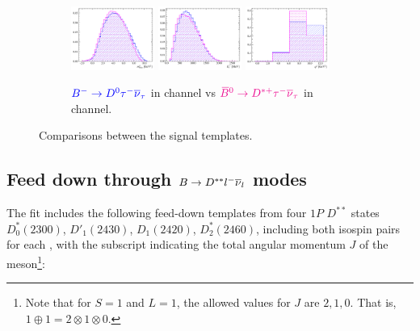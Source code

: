 \begin{figure}[!htb]
    \begin{subfigure}{\textwidth}
        \centering
        \includegraphics[width=0.3\textwidth]{figs-fit-fit-templates/histo-comp/D0_iso_D0Tau__vs__Dst_iso_DstTau__m2miss.pdf}
        \includegraphics[width=0.3\textwidth]{figs-fit-fit-templates/histo-comp/D0_iso_D0Tau__vs__Dst_iso_DstTau__el.pdf}
        \includegraphics[width=0.3\textwidth]{figs-fit-fit-templates/histo-comp/D0_iso_D0Tau__vs__Dst_iso_DstTau__q2.pdf}

        \caption{
            $\textcolor{blue}{{{{B}^-}} \rightarrow {\ensuremath{{D}^0}}{\ensuremath{\tau^-}}{\ensuremath{{\overline{\nu}}_\tau}}}$
            in \Dz channel
            vs
            $\textcolor{magenta}{{{\kern 0.18em\overline{\kern -0.18em B}}{}^0} \rightarrow {\ensuremath{{D}^{*+}}}{\ensuremath{\tau^-}}{\ensuremath{{\overline{\nu}}_\tau}}}$
            in \Dstar channel.
        }
    \end{subfigure}
    \caption{Comparisons between the signal templates.}
    \label{fig:d0-sig-vs-dst-sig}
\end{figure}


\subsection{Feed down through $B \rightarrow D^{**}{l^-}{{\overline{\nu}}_l}$ modes}
\label{tmpl:dstst}

The fit includes the following feed-down templates from four $1P$ $D^{**}$
states $D_0^*(2300)$, $D'_1(2430)$, $D_1(2420)$, $D_2^*(2460)$,
including both isospin pairs for each \Dstst,
with the subscript indicating the total angular momentum $J$ of the
meson\footnote{
    Note that for $S = 1$ and $L = 1$, the allowed values for $J$ are
    $2, 1, 0$.
    That is, $1 \oplus 1 = 2 \otimes 1 \otimes 0$.
}:

